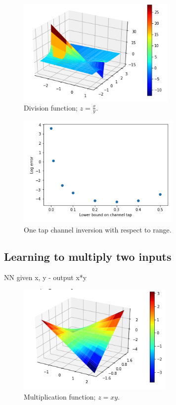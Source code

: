 \begin{figure}
\begin{center}
\includegraphics{figures/plot_of_division_function.png}
\caption{Division function; $z=\frac{x}{y}$.}
\end{center}
\label{fig:div_fx}
\end{figure}

\begin{figure}
\begin{center}
\includegraphics{figures/One_tap_channel_inversion.png}
\caption{One tap channel inversion with respect to range.}
\end{center}
\label{fig:one_tap_inv}
\end{figure}

\subsection{Learning to multiply two inputs}
NN given x, y - output x*y

\begin{figure}
\begin{center}
\includegraphics{figures/plot_of_multiplication_func.png}
\caption{Multiplication function; $z=xy$.}
\end{center}
\label{fig:mult_fx}
\end{figure}

